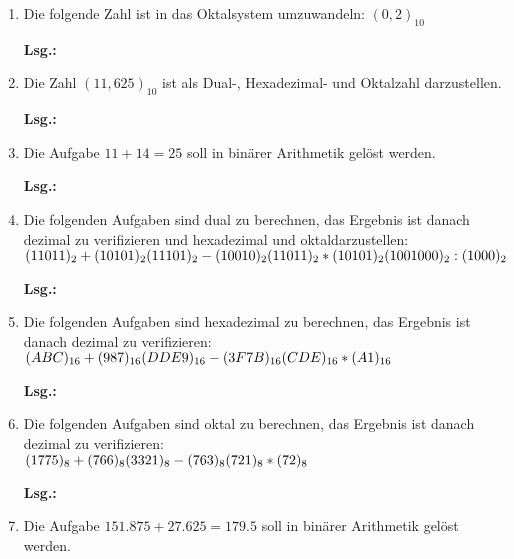\documentclass[12pt,a4paper]{scrreprt}
\newcommand{\Lsg}{\par \textbf{Lsg.: \hfill }}
\begin{document}
\begin{enumerate}
\Lsg%

\item Die folgende Zahl ist in das Oktalsystem umzuwandeln: $(0,2)_{10}$

\Lsg%

\item Die Zahl $(11,625)_{10}$ ist als Dual-, Hexadezimal- und Oktalzahl darzustellen.

\Lsg%

\item Die Aufgabe $11+14=25$ soll in binärer Arithmetik gelöst werden.

\Lsg%

\item Die folgenden Aufgaben sind dual zu berechnen, das Ergebnis ist danach dezimal zu verifizieren und hexadezimal und oktaldarzustellen: \\
\begin{math}
(11011)_2 + (10101)_2  \\
(11101)_2 - (10010)_2  \\
(11011)_2 * (10101)_2  \\
(1001000)_2 : (1000)_2
\end{math}

\Lsg%

\item Die folgenden Aufgaben sind hexadezimal zu berechnen, das Ergebnis ist danach dezimal zu verifizieren: \\
\begin{math}
(ABC)_{16} + (987)_{16}   \\
(DDE9)_{16} - (3F7B)_{16} \\
(CDE)_{16} * (A1)_{16}
\end{math}

\Lsg%

\item Die folgenden Aufgaben sind oktal zu berechnen, das Ergebnis ist danach dezimal zu verifizieren: \\
\begin{math}
(1775)_8 + (766)_8 \\
(3321)_8 - (763)_8 \\
(721)_8 * (72)_8
\end{math}

\Lsg%

\item Die Aufgabe $151.875 + 27.625 = 179.5$ soll in binärer Arithmetik gelöst werden.


\end{enumerate}
\end{document}
